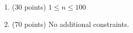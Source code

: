 \begin{enumerate}
    \tightlist
    \item (30 points) $1 \leq n \leq 100$
    \item (70 points) No additional constraints.
\end{enumerate}
    